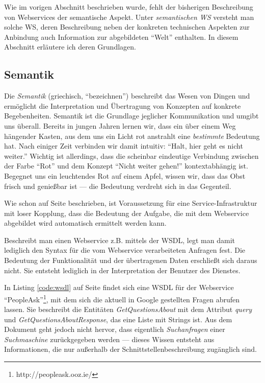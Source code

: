 Wie im vorigen Abschnitt beschrieben wurde, fehlt der bisherigen Beschreibung von Webservices der semantische Aspekt. Unter \emph{semantischen \ac{WS}} versteht man solche \ac{WS}, deren Beschreibung neben der konkreten technischen Aspekten zur Anbindung auch Information zur abgebildeten "`Welt"' enthalten. In diesem Abschnitt erläutere ich deren Grundlagen.

\subsection{Semantik}

Die \emph{Semantik} (griechisch, "`bezeichnen"') beschreibt das Wesen von Dingen und ermöglicht die Interpretation und Übertragung von Konzepten auf konkrete Begebenheiten. Semantik ist die Grundlage jeglicher Kommunikation und umgibt uns überall. Bereits in jungen Jahren lernen wir, dass ein über einem Weg hängender Kasten, aus dem uns ein Licht rot anstrahlt eine \emph{bestimmte} Bedeutung hat. Nach einiger Zeit verbinden wir damit intuitiv: "`Halt, hier geht es nicht weiter."' Wichtig ist allerdings, dass die scheinbar eindeutige Verbindung zwischen der Farbe "`Rot"' und dem Konzept "`Nicht weiter gehen!"' kontextabhängig ist. Begegnet uns ein leuchtendes Rot auf einem Apfel, wissen wir, dass das Obst frisch und genießbar ist --- die Bedeutung verdreht sich in das Gegenteil.

Wie schon auf Seite \pageref{l:intro-loosecoupling} beschrieben, ist Voraussetzung für eine Service-Infrastruktur mit loser Kopplung, dass die Bedeutung der Aufgabe, die mit dem Webservice abgebildet wird automatisch ermittelt werden kann.

Beschreibt man einen Webservice z.B. mittels der \ac{WSDL}, legt man damit lediglich den Syntax für die vom Webservice verarbeiteten Anfragen fest. Die Bedeutung der Funktionalität und der übertragenen Daten erschließt sich daraus nicht. Sie entsteht lediglich in der Interpretation der Benutzer des Dienstes. 

In Listing \ref{code:wsdl} auf Seite \pageref{code:wsdl} findet sich eine WSDL für der Webservice "`PeopleAsk"'\footnote{http://peopleask.ooz.ie/}, mit dem sich die aktuell in Google gestellten Fragen abrufen lassen. Sie beschreibt die Entitäten \emph{GetQuestionsAbout} mit dem Attribut \emph{query} und \emph{GetQuestionsAboutResponse}, das eine Liste mit Strings ist. Aus dem Dokument geht jedoch nicht hervor, dass eigentlich \emph{Suchanfragen} einer \emph{Suchmaschine} zurückgegeben werden --- dieses Wissen entsteht aus Informationen, die nur außerhalb der Schnittstellenbeschreibung zugänglich sind.

